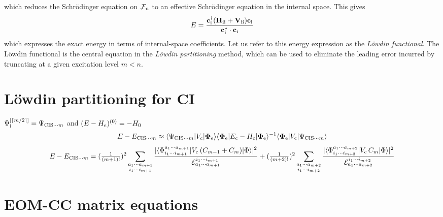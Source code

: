 \documentclass[11pt]{article}
\numberwithin{equation}{section}
\begin{document}
\begin{rmk}
which reduces the Schr\"odinger equation on $\mathcal{F}_n$ to an effective Schr\"odinger equation in the internal space.
This gives
\begin{align}
\label{eq:lowdin-functional}
  E
=
  \frac {
    \mathbf{c}_{\mathrm{i}}^\dagger
    (
      \mathbf{H}_{\mathrm{ii}}
    +
      \mathbf{V}_{\mathrm{ii}}
    )
    \mathbf{c}_{\mathrm{i}}
  }{
    \mathbf{c}_{\mathrm{i}}^*\cdot
    \mathbf{c}_{\mathrm{i}}
  }
\end{align}
which expresses the exact energy in terms of internal-space coefficients.
Let us refer to this energy expression as the \textit{L\"owdin functional}.
The L\"owdin functional is the central equation in the \textit{L\"owdin partitioning} method, which can be used to eliminate the leading error incurred by truncating at a given excitation level $m<n$.
\end{rmk}


\section{L\"owdin partitioning for CI}


\begin{rmk}
$
  \Psi _{\mathrm{i}}^{[\left\lceil m/2\right\rceil]}
=
  \Psi _{\mathrm{CIS}{\cdots}m}
$
and
$
(
  E
-
  H_e
)^{(0)}
=
-
  H_0
$
\begin{align}
  E
-
  E_{\mathrm{CIS}{\cdots}m}
\approx
  \langle\Psi _{\mathrm{CIS}{\cdots}m}|V_{\mathrm{c}}|\mathbf{\Phi }_{\mathrm{e}}\rangle
  \langle\mathbf{\Phi }_{\mathrm{e}}|E_{\mathrm{c}} - H_{\mathrm{c}}|\mathbf{\Phi }_{\mathrm{e}}\rangle^{-1}
  \langle\mathbf{\Phi }_{\mathrm{e}}|V_{\mathrm{c}}|\Psi _{\mathrm{CIS}{\cdots}m}\rangle
\end{align}
\begin{align}
  E
-
  E_{\mathrm{CIS}{\cdots}m}
=
  (\tfrac{1}{(m+1)!})^2
  \sum_{\substack{a_1\cdots a_{m+1}\\i_1\cdots i_{m+1}}}
  \frac {
    |\langle\Phi _{i_1\cdots i_{m+1}}^{a_1\cdots a_{m+1}}|V_{\mathrm{c}}\,(C_{m-1} + C_m)|\Phi \rangle|^2
  }{
    \mathcal{E}_{a_1\cdots a_{m+1}}^{i_1\cdots i_{m+1}}
  }
+
  (\tfrac{1}{(m+2)!})^2
  \sum_{\substack{a_1\cdots a_{m+2}\\i_1\cdots i_{m+2}}}
  \frac {
    |\langle\Phi _{i_1\cdots i_{m+2}}^{a_1\cdots a_{m+2}}|V_{\mathrm{c}}\,C_m|\Phi \rangle|^2
  }{
    \mathcal{E}_{a_1\cdots a_{m+2}}^{i_1\cdots i_{m+2}}
  }
\end{align}
\end{rmk}



\section{EOM-CC matrix equations}
\end{document}
